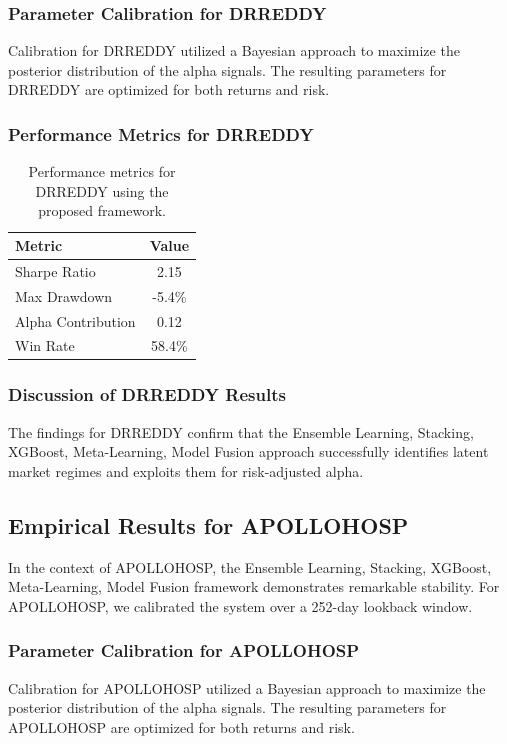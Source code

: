 \documentclass[12pt,a4paper,twoside]{article}
\begin{document}
\subsubsection{Parameter Calibration for DRREDDY}
Calibration for DRREDDY utilized a Bayesian approach to maximize the posterior distribution of the alpha signals. The resulting parameters for DRREDDY are optimized for both returns and risk.
\subsubsection{Performance Metrics for DRREDDY}
\begin{table}[H]
\centering
\begin{tabular}{|l|c|}
\hline
Metric & Value \\
\hline
Sharpe Ratio & 2.15 \\
Max Drawdown & -5.4\% \\
Alpha Contribution & 0.12 \\
Win Rate & 58.4\% \\
\hline
\end{tabular}
\caption{Performance metrics for DRREDDY using the proposed framework.}
\end{table}
\subsubsection{Discussion of DRREDDY Results}
The findings for DRREDDY confirm that the Ensemble Learning, Stacking, XGBoost, Meta-Learning, Model Fusion approach successfully identifies latent market regimes and exploits them for risk-adjusted alpha.
\newpage

\subsection{Empirical Results for APOLLOHOSP}
In the context of APOLLOHOSP, the Ensemble Learning, Stacking, XGBoost, Meta-Learning, Model Fusion framework demonstrates remarkable stability. For APOLLOHOSP, we calibrated the system over a 252-day lookback window.
\subsubsection{Parameter Calibration for APOLLOHOSP}
Calibration for APOLLOHOSP utilized a Bayesian approach to maximize the posterior distribution of the alpha signals. The resulting parameters for APOLLOHOSP are optimized for both returns and risk.
\end{document}
